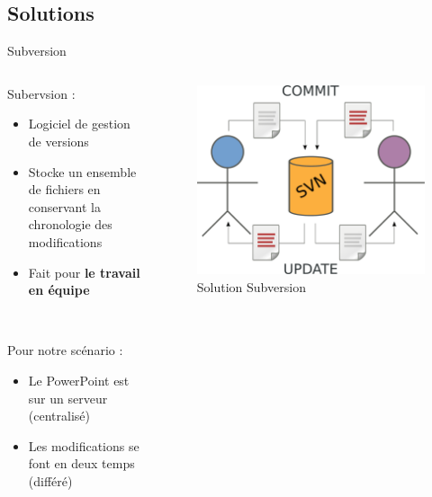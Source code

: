\subsection{Solutions}
\begin{frame}{Subversion}
\begin{columns}
  \begin{column}{.5\textwidth}
  Subervsion :
  \begin{itemize}
    \item Logiciel de gestion de versions
    \item Stocke un ensemble de fichiers en conservant la chronologie des
    modifications
    \item Fait pour \textbf{le travail en équipe}
  \end{itemize}~

  Pour notre scénario :
  \begin{itemize}
    \item Le PowerPoint est sur un serveur (centralisé)
    \item Les modifications se font en deux temps (différé)
  \end{itemize}
  \end{column}

  \begin{column}{.45\textwidth}
  \begin{figure}
    \center
    \includegraphics[width=.9\textwidth]{includes/svn.pdf}
    \caption{Solution Subversion}
  \end{figure}
  \end{column}
\end{columns}
\end{frame}

